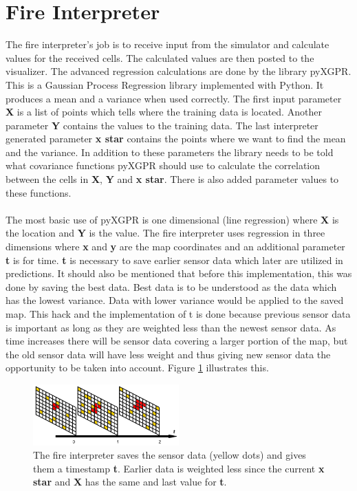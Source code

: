 \section{Fire Interpreter}
The fire interpreter's job is to receive input from the simulator and 
calculate values for the received cells. The calculated values are then posted to the visualizer. The advanced regression calculations are done by the library pyXGPR. This is a Gaussian Process Regression library implemented with Python. It produces a mean and a variance when used correctly. The first input parameter \textbf{X} is a list of points which tells where the training data is located. Another parameter \textbf{Y} contains the values to the training data. The last interpreter generated parameter \textbf{x star} contains the points where we want to find the mean and the variance. In addition to these parameters the library needs to be told what covariance functions pyXGPR should use to calculate the correlation between the cells in \textbf{X}, \textbf{Y} and \textbf{x star}. There is also added parameter values to these functions.
\\\\
The most basic use of pyXGPR is one dimensional (line regression) where \textbf{X} is the location and \textbf{Y} is the value. The fire interpreter uses regression in three dimensions where \textbf{x} and \textbf{y} are the map coordinates and an additional parameter \textbf{t} is for time. \textbf{t} is necessary to save earlier sensor data which later are utilized in predictions. It should also be mentioned that before this implementation, this was done by saving the best data. Best data is to be understood as the data which has the lowest variance. Data with lower variance would be applied to the saved map. This hack and the implementation of t is done because previous sensor data is important as long as they are weighted less than the newest sensor data. As time increases there will be sensor data covering a larger portion of the map, but the old sensor data will have less weight and thus giving new sensor data the opportunity to be taken into account. Figure \ref{fig:timeElapse} illustrates this.
\begin{figure}[here]
  \centering
      \includegraphics[width=0.5\textwidth]{solution/graphics/timeElapse.png}
  \caption{The fire interpreter saves the sensor data (yellow dots) and gives them a timestamp \textbf{t}. Earlier data is weighted less since the current \textbf{x star} and \textbf{X} has the same and last value for \textbf{t}. }
  \label{fig:timeElapse}
\end{figure}
